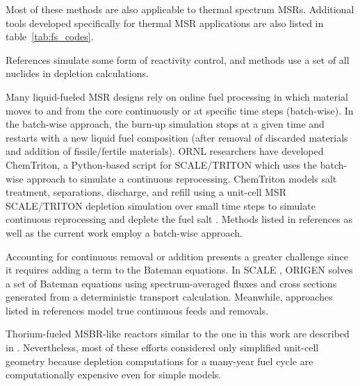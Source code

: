 Most of these methods are also applicable to thermal spectrum \glspl{MSR}. 
Additional tools developed specifically for thermal \gls{MSR} applications are 
also listed in table~\ref{tab:fs_codes}.

References 
\cite{doligez_coupled_2014,heuer_towards_2014,sheu_depletion_2013,aufiero_extended_2013} 
simulate some form of reactivity control, and methods 
\cite{doligez_coupled_2014,heuer_towards_2014,aufiero_extended_2013,ahmad_neutronics_2015, 
park_whole_2015, 
jeong_equilibrium_2016,rykhlevskii_online_2017,nuttin_potential_2005} use a set 
of all nuclides in depletion calculations. 

Many liquid-fueled \gls{MSR} designs rely on online fuel processing in which  
material moves to and from the core continuously or at specific time steps 
(batch-wise). In the batch-wise approach, the burn-up simulation stops at a given 
time and restarts with a new liquid fuel composition (after removal of discarded 
materials and addition of fissile/fertile materials). \gls{ORNL} researchers 
have developed ChemTriton, a Python-based script for SCALE/TRITON which uses the 
batch-wise approach to simulate a continuous reprocessing. ChemTriton models salt 
treatment, separations, discharge, and refill using a unit-cell \gls{MSR} 
SCALE/TRITON depletion simulation over small time steps to simulate continuous 
reprocessing and deplete the fuel salt \cite{powers_new_2013}. Methods listed in 
references \cite{fiorina_investigation_2013,sheu_depletion_2013,park_whole_2015, 
jeong_equilibrium_2016,powers_inventory_2014,betzler_molten_2017,rykhlevskii_online_2017} 
as well as the current work employ a batch-wise approach.

Accounting for continuous removal or addition presents a greater challenge since it 
requires adding a term to the Bateman equations. In SCALE 
\cite{bowman_scale_2011}, ORIGEN \cite{gauld_isotopic_2011} solves a set of 
Bateman equations using spectrum-averaged fluxes and cross sections generated 
from a deterministic transport calculation. Meanwhile, approaches listed in references 
\cite{doligez_coupled_2014,heuer_towards_2014,aufiero_extended_2013,nuttin_potential_2005} 
model true continuous feeds and removals. 

Thorium-fueled \gls{MSBR}-like reactors similar to the one in this work are 
described in \cite{park_whole_2015, 
jeong_equilibrium_2016,powers_new_2013,powers_inventory_2014, 
betzler_molten_2017,rykhlevskii_online_2017,nuttin_potential_2005}. 
Nevertheless, most of these efforts considered only simplified unit-cell 
geometry because depletion computations for a many-year fuel cycle are 
computationally expensive even for simple models. 

